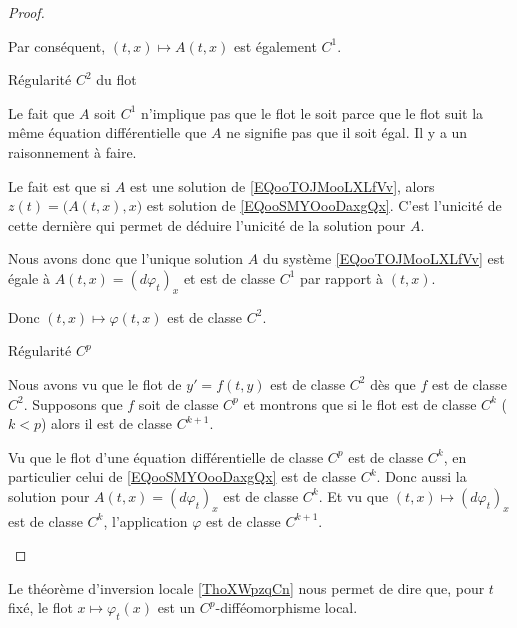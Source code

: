 \begin{proof}
\begin{subproof}
        Par conséquent, \( (t,x)\mapsto A(t,x)\) est également \( C^1\).


    \item[Régularité \( C^2\) du flot]

        Le fait que \( A\) soit \( C^1\) n'implique pas que le flot le soit parce que le flot suit la même équation différentielle que \( A\) ne signifie pas que il soit égal. Il y a un raisonnement à faire. 

        Le fait est que si \( A\) est une solution de \eqref{EQooTOJMooLXLfVv}, alors \( z(t)=\big( A(t,x),x \big)\) est solution de \eqref{EQooSMYOooDaxgQx}. C'est l'unicité de cette dernière qui permet de déduire l'unicité de la solution pour \( A\).

        Nous avons donc que l'unique solution \( A\) du système \eqref{EQooTOJMooLXLfVv} est égale à \( A(t,x)=(d\varphi_t)_x\) et est de classe \( C^1\) par rapport à \( (t,x)\).

        Donc \( (t,x)\mapsto  \varphi(t,x)\) est de classe \( C^2\).

    \item[Régularité \( C^p\)]

        Nous avons vu que le flot de \( y'=f(t,y)\) est de classe \( C^2\) dès que \( f\) est de classe \( C^2\). Supposons que \( f\) soit de classe \( C^p\) et montrons que si le flot est de classe \( C^k\) (\( k<p\)) alors il est de classe \( C^{k+1}\).

        Vu que le flot d'une équation différentielle de classe \( C^p\) est de classe \( C^k\), en particulier celui de \eqref{EQooSMYOooDaxgQx} est de classe \( C^k\). Donc aussi la solution pour \( A(t,x)=(d\varphi_t)_x\) est de classe \( C^k\). Et vu que \(  (t,x)\mapsto (d\varphi_t)_x   \) est de classe \( C^k\), l'application \( \varphi\) est de classe \( C^{k+1}\).

    \end{subproof}
\end{proof}

\begin{normaltext}      \label{NORMooWEWVooXbGmfE}
    Le théorème d'inversion locale \ref{ThoXWpzqCn} nous permet de dire que, pour \( t\) fixé, le flot \( x\mapsto \varphi_t(x)\) est un \( C^p\)-difféomorphisme local.
\end{normaltext}

